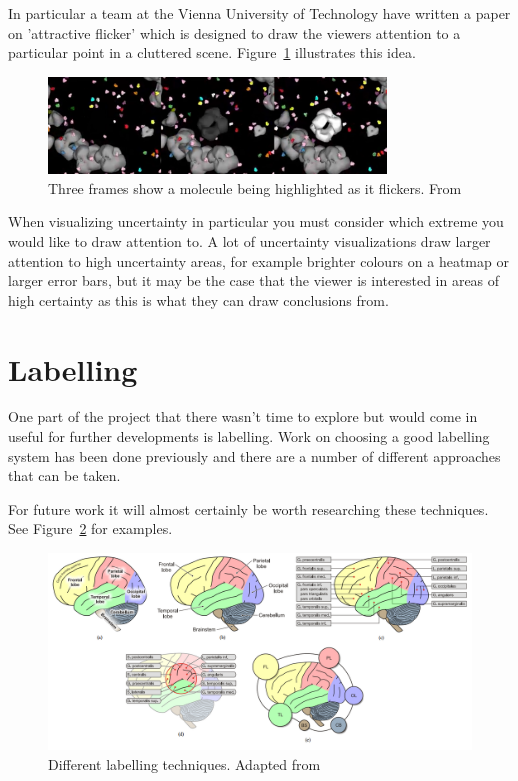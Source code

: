 In particular a team at the Vienna University of Technology have written a paper on 'attractive flicker' which is designed to draw the viewers attention to a particular point in a cluttered scene\cite{attractiveflicker}. Figure~\ref{fig:flicker} illustrates this idea.

\begin{figure}[h]
    \centering
	\includegraphics[width=0.8\textwidth]{images/background/flicker.png}
    \caption{Three frames show a molecule being highlighted as it flickers. From \cite{attractiveflicker}}
    \label{fig:flicker}
\end{figure}

When visualizing uncertainty in particular you must consider which extreme you would like to draw attention to. A lot of uncertainty visualizations draw larger attention to high uncertainty areas, for example brighter colours on a heatmap or larger error bars, but it may be the case that the viewer is interested in areas of high certainty as this is what they can draw conclusions from.

\newpage
\section{Labelling}\label{background:labelling}
One part of the project that there wasn't time to explore but would come in useful for further developments is labelling. Work on choosing a good labelling system has been done previously and there are a number of different approaches that can be taken\cite{labelling}.

For future work it will almost certainly be worth researching these techniques. See Figure~\ref{fig:labels} for examples.

\begin{figure}[h]
    \centering
	\includegraphics[width=1.0\textwidth]{images/background/labels.png}
    \caption{Different labelling techniques. Adapted from \cite{labelling}}
    \label{fig:labels}
\end{figure}